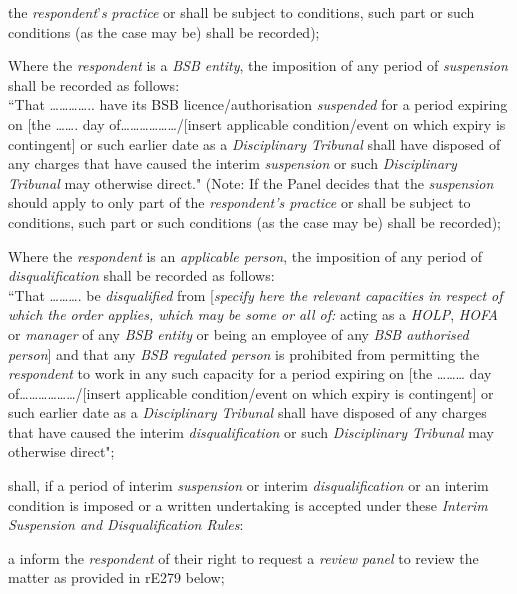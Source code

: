 the \emph{respondent}'\emph{s} \emph{practice} or shall be subject to
conditions, such part or such conditions (as the case may be) shall be
recorded);\\
\item  Where the \emph{respondent }is a \emph{BSB entity}, the imposition of
any period of \emph{suspension} shall be recorded as follows:\\
``That \ldots\ldots\ldots\ldots.. have its BSB
licence/authorisation \emph{suspended} for a period expiring on {[}the
\ldots\ldots. day of\ldots\ldots\ldots\ldots\ldots\ldots/{[}insert
applicable condition/event on which expiry is contingent{]} or such
earlier date as a \emph{Disciplinary Tribunal} shall have disposed of
any charges that have caused the interim \emph{suspension} or
such \emph{Disciplinary Tribunal} may otherwise direct." (Note: If the
Panel decides that the \emph{suspension} should apply to only part of
the \emph{respondent's practice} or shall be subject to conditions, such
part or such conditions (as the case may be) shall be recorded);\\
\item  Where the \emph{respondent }is an \emph{applicable person}, the
imposition of any period of \emph{disqualification} shall be recorded as
follows:\\
``That \ldots\ldots\ldots. be \emph{disqualified} from {[}\emph{specify
here the relevant capacities in respect of which the order applies,
which may be some or all of: }acting as
a \emph{HOLP}, \emph{HOFA} or \emph{manager} of any \emph{BSB entity} or
being an employee of any \emph{BSB authorised person}{]} and that
any \emph{BSB regulated person} is prohibited from permitting
the \emph{respondent }to work in any such capacity for a period expiring
on {[}the \ldots\ldots\ldots{} day
of\ldots\ldots\ldots\ldots\ldots\ldots/{[}insert applicable
condition/event on which expiry is contingent{]} or such earlier date as
a \emph{Disciplinary Tribunal} shall have disposed of any charges that
have caused the interim \emph{disqualification} or
such \emph{Disciplinary Tribunal} may otherwise direct";\la \item shall, if a period of interim \emph{suspension} or
interim \emph{disqualification} or an interim condition is imposed or a
written undertaking is accepted under these \emph{Interim Suspension and
Disqualification Rules}:\al \item a inform the \emph{respondent} of their right to request a \emph{review
panel} to review the matter as provided in rE279 below;\\
